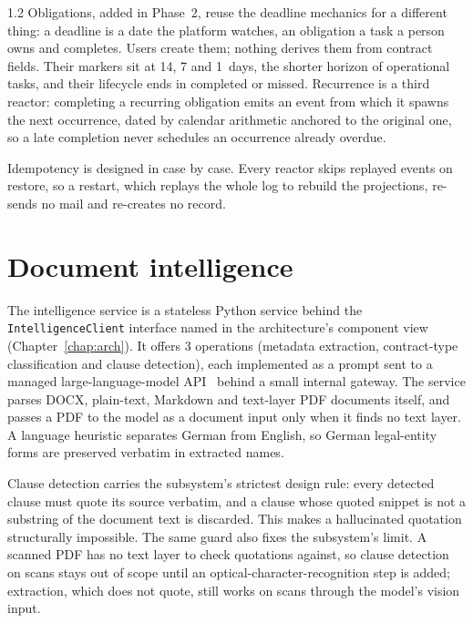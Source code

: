 \begin{spacing}{1.2}
Obligations, added in Phase~2, reuse the deadline mechanics for a
different thing: a deadline is a date the platform watches, an
obligation a task a person owns and completes. Users create them;
nothing derives them from contract fields. Their markers sit at 14, 7
and 1~days, the shorter horizon of operational tasks, and their
lifecycle ends in completed or missed. Recurrence is a third reactor: completing
a recurring obligation emits an event from which it spawns the next
occurrence, dated by calendar arithmetic anchored to the original one,
so a late completion never schedules an occurrence already overdue.

Idempotency is designed in case by case. Every reactor skips replayed
events on restore, so a restart, which replays the whole log to rebuild
the projections, re-sends no mail and re-creates no record.

\section{Document intelligence}
\label{sec:doc-intel}

The intelligence service is a stateless Python service behind the
\texttt{IntelligenceClient} interface named in the architecture's
component view (Chapter~\ref{chap:arch}). It offers 3 operations
(metadata extraction, contract-type classification and clause
detection), each implemented as a prompt sent to a managed
large-language-model API~\cite{AnthropicClaude} behind a small internal
gateway. The service parses DOCX,
plain-text, Markdown and text-layer PDF documents itself, and passes a
PDF to the model as a document input only when it finds no text layer.
A language heuristic separates German from English, so German
legal-entity forms are preserved verbatim in extracted names.

Clause detection carries the subsystem's strictest design rule: every
detected clause must quote its source verbatim, and a clause whose
quoted snippet is not a substring of the document text is discarded.
This makes a hallucinated quotation structurally impossible. The same
guard also fixes the subsystem's limit. A scanned PDF has no text layer
to check quotations against, so clause detection on scans stays out of
scope until an optical-character-recognition step is added; extraction,
which does not quote, still works on scans through the model's vision
input.


\end{spacing}
